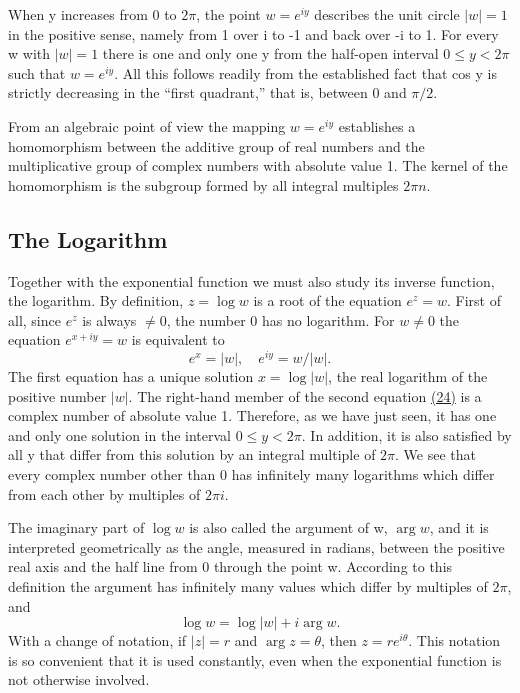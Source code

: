 When y increases from 0 to $2\pi$, the point $w = e^{iy}$ describes the unit circle $|w| = 1$ in the positive sense, namely from 1 over i to -1 and back over -i to 1. For every w with $|w| = 1$ there is one and only one y from the half-open interval $0 \leq y < 2\pi$ such that $w = e^{iy}$. All this follows readily from the established fact that cos y is strictly decreasing in the “first quadrant,” that is, between 0 and $\pi/2$.

From an algebraic point of view the mapping $w = e^{iy}$ establishes a homomorphism between the additive group of real numbers and the multiplicative group of complex numbers with absolute value 1. The kernel of the homomorphism is the subgroup formed by all integral multiples $2\pi n$.


\setcounter{section}{3}\setcounter{subsection}{3}\subsection{The Logarithm}\label{sec:2.3.4}
Together with the exponential function we must also study its inverse function, the logarithm. By definition, $z = \log w$ is a root of the equation $e^{z} = w$. First of all, since $e^{z}$ is always $\neq 0$, the number 0 has no logarithm. For $w \neq 0$ the equation $e^{x+iy} = w$ is equivalent to
\begin{equation*}
e ^ {x} = | w |, \quad e ^ {i y} = w / | w |.\tag{24}\label{eq:2.24}
\end{equation*}
The first equation has a unique solution $x = \log |w|$, the real logarithm of the positive number $|w|$. The right-hand member of the second equation \hyperref[eq:2.24]{(24)} is a complex number of absolute value 1. Therefore, as we have just seen, it has one and only one solution in the interval $0 \leq y < 2\pi$. In addition, it is also satisfied by all y that differ from this solution by an integral multiple of $2\pi$. We see that every complex number other than 0 has infinitely many logarithms which differ from each other by multiples of $2\pi i$.

The imaginary part of $\log w$ is also called the argument of w, $\arg w$, and it is interpreted geometrically as the angle, measured in radians, between the positive real axis and the half line from 0 through the point w. According to this definition the argument has infinitely many values which differ by multiples of $2\pi$, and
\begin{equation*}
\log w = \log | w | + i \arg w.
\end{equation*}
With a change of notation, if $|z| = r$ and $\arg z = \theta$, then $z = re^{i\theta}$. This notation is so convenient that it is used constantly, even when the exponential function is not otherwise involved.

